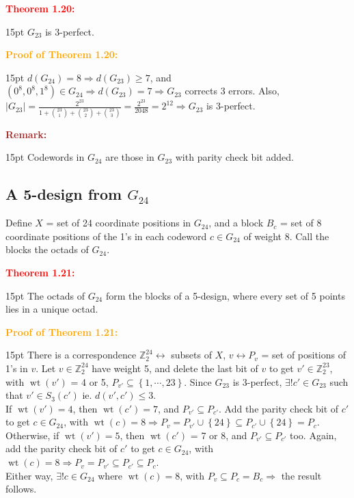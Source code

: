 \documentclass[12pt]{article}
\newcommand{\noparskip}{\vspace{-\parskip}}
\newenvironment{dent}
	{\begin{adjustwidth}{15pt}{}\noparskip}
	{\end{adjustwidth}}
\newenvironment{result}[1]
	{\textcolor{Red}{\textbf{#1:}}\begin{dent}}
	{\end{dent}}
\newenvironment{proof}[1]
	{\textcolor{Orange}{\textbf{Proof of #1:}}\begin{dent}}
	{\end{dent}}
\newenvironment{remark}
	{\textcolor{Brown}{\textbf{Remark:}}\begin{dent}}
	{\end{dent}}
\renewcommand{\implies}{\Rightarrow}
\newcommand{\set}[1]{\left\{ #1 \right\}}
\newcommand{\sizeof}[1]{\left| #1 \right|}
\newcommand{\Z}{\mathbb{Z}}
\newcommand{\wt}[1]{\operatorname{wt}(#1)}
\begin{document}
\begin{result}{Theorem 1.20}
$G_{23}$ is 3-perfect.
\end{result}

\begin{proof}{Theorem 1.20}
$d(G_{24}) = 8 \implies d(G_{23}) \ge 7$, and $(0^8, 0^8, 1^8) \in G_{24} \implies d(G_{23}) = 7 \implies G_{23}$ corrects 3 errors. Also, $\sizeof{G_{23}} = \frac{2^{23}}{1 + \binom{23}{1} + \binom{23}{2} + \binom{23}{3}} = \frac{2^{23}}{2048} = 2^{12} \implies G_{23}$ is 3-perfect. 
\end{proof}

\begin{remark}
Codewords in $G_{24}$ are those in $G_{23}$ with parity check bit added.
\end{remark}

\subsection{A 5-design from $G_{24}$}

Define $X$ = set of 24 coordinate positions in $G_{24}$, and a block $B_c$ = set of 8 coordinate positions of the 1's in each codeword $c \in G_{24}$ of weight 8. Call the blocks the octads of $G_{24}$.

\begin{result}{Theorem 1.21}
The octads of $G_{24}$ form the blocks of a 5-design, where every set of 5 points lies in a unique octad.
\end{result}

\begin{proof}{Theorem 1.21}
There is a correspondence $\Z_2^{24} \leftrightarrow$ subsets of $X$, $v \leftrightarrow P_v$ = set of positions of 1's in $v$. Let $v \in \Z_2^{24}$ have weight 5, and delete the last bit of $v$ to get $v' \in \Z_2^{23}$, with $\wt{v'}$ = 4 or 5, $P_{v'} \subseteq \set{1, \cdots, 23}$. Since $G_{23}$ is 3-perfect, $\exists! c' \in G_{23}$ such that $v' \in S_3(c')$ ie. $d(v', c') \le 3$. \\
If $\wt{v'} = 4$, then $\wt{c'} = 7$, and $P_{v'} \subseteq P_{c'}$. Add the parity check bit of $c'$ to get $c \in G_{24}$, with $\wt{c} = 8 \implies P_v = P_{v'} \cup \set{24} \subseteq P_{c'} \cup \set{24} = P_c$. \\ Otherwise, if $\wt{v'} = 5$, then $\wt{c'}$ = 7 or 8, and $P_{v'} \subseteq P_{c'}$ too. Again, add the parity check bit of $c'$ to get $c \in G_{24}$, with $\wt{c} = 8 \implies P_v = P_{v'} \subseteq P_{c'} \subseteq P_c$. \\
Either way, $\exists! c \in G_{24}$ where $\wt{c} = 8$, with $P_v \subseteq P_c = B_c \implies$ the result follows.
\end{proof}
\end{document}
